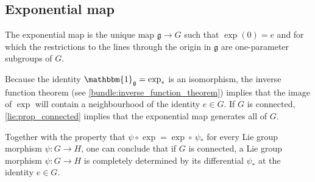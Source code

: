 
\subsection{Exponential map}

    \begin{property}[Uniqueness]
        The exponential map is the unique map $\mathfrak{g}\rightarrow G$ such that $\exp(0) = e$ and for which the restrictions to the lines through the origin in $\mathfrak{g}$ are one-parameter subgroups of $G$.
    \end{property}
    \begin{result}\label{lie:exp_result}
        Because the identity $\mathbbm{1}_{\mathfrak{g}}=\exp_\ast$ is an isomorphism, the inverse function theorem (see \cref{bundle:inverse_function_theorem}) implies that the image of $\exp$ will contain a neighbourhood of the identity $e\in G$. If $G$ is connected, \cref{lie:prop_connected} implies that the exponential map generates all of $G$.

        Together with the property that $\psi\circ\exp = \exp\circ\,\psi_\ast$ for every Lie group morphism $\psi:G\rightarrow H$, one can conclude that if $G$ is connected, a Lie group morphism $\psi:G\rightarrow H$ is completely determined by its differential $\psi_\ast$ at the identity $e\in G$.
    \end{result}

